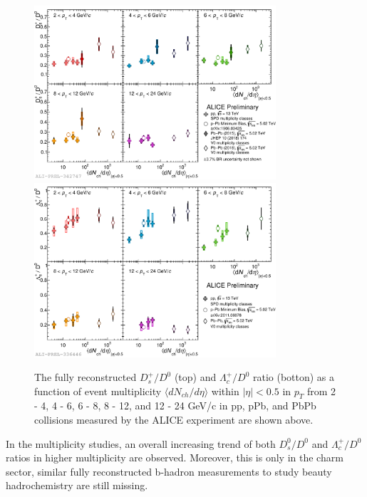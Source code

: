 \begin{figure}[hbtp]
\begin{center}
\includegraphics[width=0.80\textwidth]{Figures/Chapter2/ALICEDsD0Multi.pdf}
\includegraphics[width=0.80\textwidth]{Figures/Chapter2/ALICELambdaD0Multi.pdf}
\caption{The fully reconstructed $D^+_s/D^0$ (top) and $\Lambda_c^+/D^0$ ratio (botton) as a function of event multiplicity $\langle dN_{ch}/d\eta \rangle$ within $|\eta| < 0.5$ in $p_T$ from 2 - 4, 4 - 6, 6 - 8, 8 - 12, and 12 - 24 GeV/c in pp, pPb, and PbPb collisions measured by the ALICE experiment are shown above.}
\label{ALICEMulti}
\end{center}
\end{figure}   



In the multiplicity studies, an overall increasing trend of both $D^0_s/D^0$ and $\Lambda_c^+/D^0$ ratios in higher multiplicity are observed. Moreover, this is only in the charm sector, similar fully reconstructed b-hadron measurements to study beauty hadrochemistry are still missing. 



